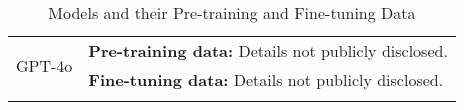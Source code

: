 \begin{longtable}{|l|p{10cm}|}
\hline
\multirow{2}{*}{GPT-4o} & 
\textbf{Pre-training data:} Details not publicly disclosed. \\
& 
\textbf{Fine-tuning data:} Details not publicly disclosed. \\
\hline
\caption{Models and their Pre-training and Fine-tuning Data}
\end{longtable}
\label{tab:training_data_long}
\clearpage
\twocolumn

 
